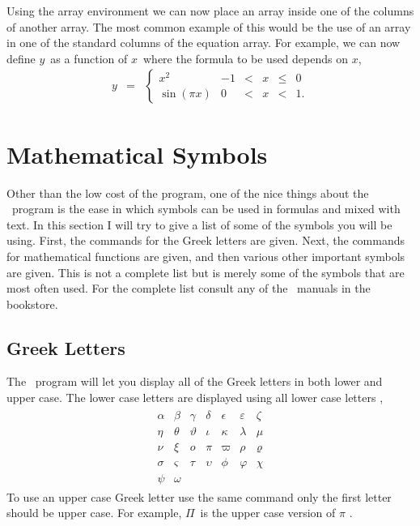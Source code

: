 Using the array environment we can now place an array inside 
one of the columns of another array.  The most common example
of this would be the use of an array in one of the standard
columns of the equation array.  For example, we can now define
$y$\ as a function of $x$\ where the formula to be used depends
on $x$,
\begin{eqnarray}
y & = & \left\{
           \begin{array}{lrcccl}
              x^2           & -1 & < & x & \leq & 0 \\
              \sin(\pi x)   &  0 & < & x & <    & 1.
           \end{array}
        \right.
\end{eqnarray}


\section{Mathematical Symbols}
Other than the low cost of the program, one of the nice things
about the \lat\ program is the ease in which symbols can be 
used in formulas and mixed with text.  In this section I will
try to give a list of some of the symbols you will be using.
First, the commands for the Greek letters are given.  Next,
the commands for mathematical functions are given, and then
various other important symbols are given. This is not a 
complete list but is merely some of the symbols that are most
often used.  For the complete list consult any of the \lat\ 
manuals in the bookstore.

\subsection{Greek Letters}
The \lat\ program will let you display all of the Greek letters
in both lower and upper case.  The lower case letters are displayed
using all lower case letters \cite{The-Manual},
\begin{eqnarray}
    \begin{array}{ccccccc}
       \alpha & \beta     & \gamma    & \delta   & \epsilon & \varepsilon & \zeta \\
       \eta   & \theta    & \vartheta & \iota    & \kappa   & \lambda     & \mu   \\
       \nu    & \xi       & o         & \pi      & \varpi   & \rho        & \varrho \\
       \sigma & \varsigma & \tau      & \upsilon & \phi     & \varphi     & \chi   \\
       \psi   & \omega
    \end{array}
\nonumber
\end{eqnarray}
To use an upper case Greek letter use the same command only the 
first letter should be upper case.  For example, $\Pi$\ is the
upper case version of $\pi$ \cite{The-Manual}.

